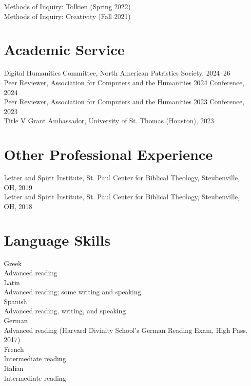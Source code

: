 \documentclass[letterpaper,12pt]{article}
\newcommand{\years}[1]{%
  {\reversemarginpar\strut\marginnote{{\small#1}}}%
}
\begin{document}
{{{{{{{{Methods of Inquiry: Tolkien (Spring 2022) \\ [.3cm]
%
Methods of Inquiry: Creativity (Fall 2021)
%

\section*{Academic Service}

%
Digital Humanities Committee, North American Patristics Society, 2024--26 \\ [.3cm]
%
%
Peer Reviewer, Association for Computers and the Humanities 2024 Conference, 2024 \\ [.3cm]
%
%
Peer Reviewer, Association for Computers and the Humanities 2023 Conference, 2023 \\ [.3cm]
%
%
Title V Grant Ambassador, University of St. Thomas (Houston), 2023

\section*{Other Professional Experience}

%
Letter and Spirit Institute, St. Paul Center for Biblical Theology, Steubenville, OH, 2019 \\ [.3cm]
%
%
Letter and Spirit Institute, St. Paul Center for Biblical Theology, Steubenville, OH, 2018

\section*{Language Skills}

Greek \\ Advanced reading \\ [.3cm]
%
Latin \\ Advanced reading; some writing and speaking \\ [.3cm]
%
Spanish \\ Advanced reading, writing, and speaking \\ [.3cm]
%
German \\ Advanced reading (Harvard Divinity School's German Reading Exam, High Pass, 2017) \\ [.3cm]
%
French \\ Intermediate reading \\ [.3cm]
%
Italian \\ Intermediate reading

}}}}}}}}
\end{document}
